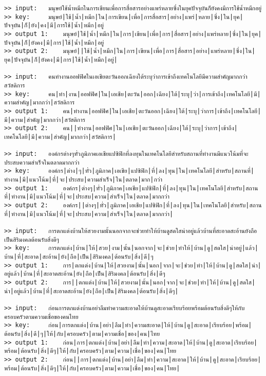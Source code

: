 \documentclass[11pt]{article}
\begin{document}
\begin{Verbatim}[commandchars=\\\{\}]
>> input:	มนุษย์ใช้น้ำหมึกในการเขียนเพื่อการสื่อสารอย่างแพร่หลายซึ่งในยุคปัจจุบันก็ยังคงมีการใช้น้ำหมึกอยู่
>> key:		มนุษย์|ใช้|น้ำ|หมึก|ใน|การเขียน|เพื่อ|การสื่อสาร|อย่าง|แพร่|หลาย|ซึ่ง|ใน|ยุค|ปัจจุบัน|ก็|ยัง|คง|มี|การใช้|น้ำ|หมึก|อยู่
>> output 1:	มนุษย์|ใช้|น้ำ|หมึก|ใน|การ|เขียน|เพื่อ|การ|สื่อสาร|อย่าง|แพร่หลาย|ซึ่ง|ใน|ยุค|ปัจจุบัน|ก็|ยังคง|มี|การ|ใช้|น้ำ|หมึก|อยู่
>> output 2:	มนุษย์||ใช้|น้ำ|หมึก|ใน|การ|เขียน|เพื่อ|การ|สื่อสาร|อย่าง|แพร่หลาย|ซึ่ง|ใน|ยุค|ปัจจุบัน|ก็|ยังคง|มี|การ|ใช้|น้ำ|หมึก|อยู่|

>> input:	คนทำงานออฟฟิศในเอเชียตะวันออกเฉียงใต้ระบุว่าการเข้าถึงเทคโนโลยีมีความสำคัญมากกว่าสวัสดิการ
>> key:		คน|ทำ|งาน|ออฟฟิศ|ใน|เอเชีย|ตะวัน|ออก|เฉียง|ใต้|ระบุ|ว่า|การเข้าถึง|เทคโนโลยี|มี|ความสำคัญ|มากกว่า|สวัสดิการ
>> output 1:	คน|ทำงาน|ออฟฟิศ|ใน|เอเชีย|ตะวันออก|เฉียง|ใต้|ระบุ|ว่าการ|เข้าถึง|เทคโนโลยี|มี|ความ|สำคัญ|มากกว่า|สวัสดิการ
>> output 2:	คน||ทำงาน|ออฟฟิศ|ใน|เอเชีย|ตะวันออก|เฉียง|ใต้|ระบุ|ว่าการ|เข้าถึง|เทคโนโลยี|มี|ความ|สำคัญ|มากกว่า|สวัสดิการ|

>> input:	องค์กรต่างๆทั่วภูมิภาคเอเชียแปซิฟิกที่ลงทุนในเทคโนโลยีสำหรับสถานที่ทำงานมีแนวโน้มที่จะประสบความสำเร็จในตลาดมากกว่า
>> key:		องค์กร|ต่าง|ๆ|ทั่ว|ภูมิภาค|เอเชีย|แปซิฟิก|ที่|ลง|ทุน|ใน|เทคโนโลยี|สำหรับ|สถานที่|ทำงาน|มี|แนวโน้ม|ที่|จะ|ประสบ|ความสำเร็จ|ใน|ตลาด|มาก|กว่า
>> output 1:	องค์กร|ต่างๆ|ทั่ว|ภูมิภาค|เอเชีย|แปซิฟิก|ที่|ลง|ทุน|ใน|เทคโนโลยี|สำหรับ|สถานที่|ทำงาน|มี|แนวโน้ม|ที่|จะ|ประสบ|ความ|สำเร็จ|ใน|ตลาด|มากกว่า
>> output 2:	องค์กร||ต่างๆ|ทั่ว|ภูมิภาค|เอเชีย|แปซิฟิก|ที่|ลง|ทุน|ใน|เทคโนโลยี|สำหรับ|สถานที่|ทำงาน|มี|แนวโน้ม|ที่|จะ|ประสบ|ความ|สำเร็จ|ใน|ตลาด|มากกว่า|

>> input:	การตกแต่งบ้านให้สวยงามนั้นนอกจากจะช่วยทำให้บ้านดูสดใสน่าอยู่แล้วบ้านที่สะอาดสะอ้านยังถือเป็นสิริมงคลต้อนรับสิ่งดีๆ
>> key:		การตกแต่ง|บ้าน|ให้|สวย|งาม|นั้น|นอกจาก|จะ|ช่วย|ทำให้|บ้าน|ดู|สดใส|น่าอยู่|แล้ว|บ้าน|ที่|สะอาด|สะอ้าน|ยัง|ถือ|เป็น|สิริมงคล|ต้อนรับ|สิ่ง|ดี|ๆ
>> output 1:	การ|ตกแต่ง|บ้าน|ให้|สวยงาม|นั้น|นอก|จาก|จะ|ช่วย|ทำ|ให้|บ้าน|ดู|สดใส|น่า|อยู่แล้ว|บ้าน|ที่|สะอาดสะอ้าน|ยัง|ถือ|เป็น|สิริมงคล|ต้อนรับ|สิ่ง|ดีๆ
>> output 2:	การ||ตกแต่ง|บ้าน|ให้|สวยงาม|นั้น|นอก|จาก|จะ|ช่วย|ทำ|ให้|บ้าน|ดู|สดใส|น่า|อยู่แล้ว|บ้าน|ที่|สะอาดสะอ้าน|ยัง|ถือ|เป็น|สิริมงคล|ต้อนรับ|สิ่ง|ดีๆ|

>> input:	ก่อนการตกแต่งบ้านอย่าลืมทำความสะอาดให้บ้านดูสะอาดเรียบร้อยพร้อมต้อนรับสิ่งดีๆให้กับครอบครัวตามความเชื่อของคนไทย
>> key:		ก่อน|การตกแต่ง|บ้าน|อย่า|ลืม|ทำ|ความสะอาด|ให้|บ้าน|ดู|สะอาด|เรียบร้อย|พร้อม|ต้อนรับ|สิ่ง|ดี|ๆ|ให้|กับ|ครอบครัว|ตาม|ความเชื่อ|ของ|คน|ไทย
>> output 1:	ก่อน|การ|ตกแต่ง|บ้าน|อย่า|ลืม|ทำ|ความ|สะอาด|ให้|บ้าน|ดู|สะอาด|เรียบร้อย|พร้อม|ต้อนรับ|สิ่ง|ดีๆ|ให้|กับ|ครอบครัว|ตาม|ความ|เชื่อ|ของ|คน|ไทย
>> output 2:	ก่อน||การ|ตกแต่ง|บ้าน|อย่า|ลืม|ทำ|ความ|สะอาด|ให้|บ้าน|ดู|สะอาด|เรียบร้อย|พร้อม|ต้อนรับ|สิ่ง|ดีๆ|ให้|กับ|ครอบครัว|ตาม|ความ|เชื่อ|ของ|คน|ไทย|


\end{Verbatim}
\end{document}
